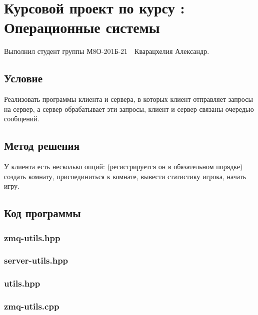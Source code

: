 \documentclass[12pt]{article}
\begin{document}
	
	\section*{\centering Курсовой проект по курсу :\\ Операционные системы}
	
	Выполнил студент группы М8О-201Б-21 \,\, Кварацхелия Александр.
	
	\subsection*{Условие}
	
	Реализовать программы клиента и сервера, в которых клиент отправляет запросы на сервер, а сервер обрабатывает эти запросы, клиент и сервер связаны очередью сообщений.	
	
	\subsection*{Метод решения}
	
	У клиента есть несколько опций: (регистрируется он в обязательном порядке) создать комнату, присоединиться к комнате, вывести статистику игрока, начать игру. 
	
	\subsection*{Код программы}
	
	\subsubsection*{zmq-utils.hpp}
	
	
	
	\subsubsection*{server-utils.hpp}
	
	
	
	\subsubsection*{utils.hpp}
	
	
	
	\subsubsection*{zmq-utils.cpp}
	
\end{document}
